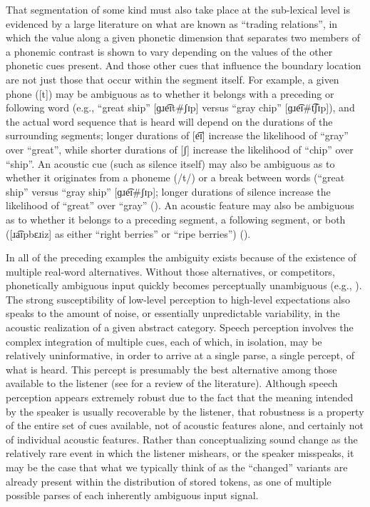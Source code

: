 That segmentation of some kind must also take place at the sub-lexical
level is evidenced by a large literature on what are known as “trading
relations”, in which the value along a given phonetic dimension
that separates two members of a phonemic contrast is shown to vary
depending on the values of the other phonetic cues present. And those
other cues that influence the boundary location are not just those
that occur within the segment itself. For example, a given phone ({[t]})
may be ambiguous as to whether it belongs with a preceding or following
word (e.g., “great ship” {[}{ɡɹe͡ɪt}\#{ʃɪp}{]}
versus “gray chip” {[}{ɡɹe͡ɪ}\#{t͡ʃɪp}{]}),
and the actual word sequence that is heard will depend on the durations
of the surrounding segments; longer durations of {[e͡ɪ]}
increase the likelihood of “gray” over “great”, while
shorter durations of {[ʃ]} increase the likelihood of “chip”
over “ship”. An acoustic cue (such as silence itself) may also
be ambiguous as to whether it originates from a phoneme ({/t/})
or a break between words (“great ship” versus “gray ship”
{[}{ɡɹe͡ɪ}\#{ʃɪp}{]}; longer durations of silence
increase the likelihood of “great” over “gray” (\citealt{repp1978perceptual}).
An acoustic feature may also be ambiguous as to whether it belongs
to a preceding segment, a following segment, or both ({[}{ɹa͡ɪpbɛɹiz}{]}
as either “right berries” or “ripe berries”) (\citealt{Gow2003}). 

In all of the preceding examples the ambiguity exists because of the
existence of multiple real-word alternatives. Without those alternatives,
or competitors, phonetically ambiguous input quickly becomes perceptually
unambiguous (e.g., \citealp{warren1970perceptual,ganong1980phonetic}).
The strong susceptibility of low-level perception to high-level expectations
also speaks to the amount of noise, or essentially unpredictable variability,
in the acoustic realization of a given abstract category. Speech perception
involves the complex integration of multiple cues, each of which,
in isolation, may be relatively uninformative, in order to arrive
at a single parse, a single percept, of what is heard. This percept
is presumably the best alternative among those available to the listener
(see \citet{davis2007hearing} for a review of the literature). Although
speech perception appears extremely robust due to the fact that the
meaning intended by the speaker is usually recoverable by the listener,
that robustness is a property of the entire set of cues available,
not of acoustic features alone, and certainly not of individual acoustic
features. Rather than conceptualizing sound change as the relatively
rare event in which the listener mishears, or the speaker misspeaks,
it may be the case that what we typically think of as the “changed”
variants are already present within the distribution of stored tokens,
as one of multiple possible parses of each inherently ambiguous input
signal.

